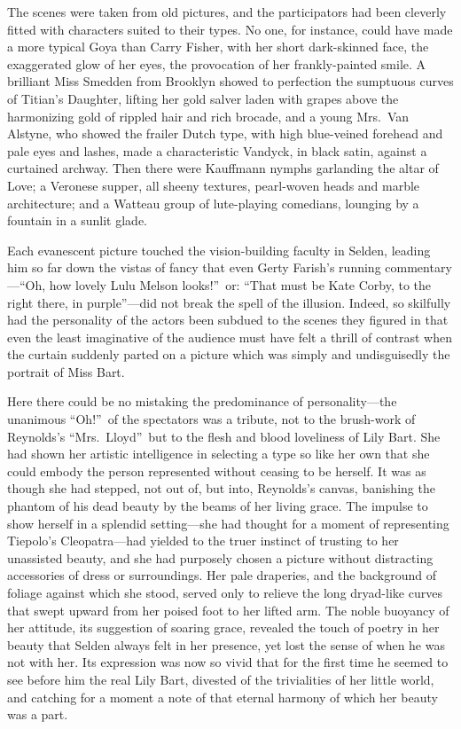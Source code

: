 \documentclass[12pt,a4paper]{book}
\begin{document}
The scenes were taken from old pictures, and the participators
had been cleverly fitted with characters suited to their types. 
No one, for instance, could have made a more typical Goya than
Carry Fisher, with her short dark-skinned face, the exaggerated
glow of her eyes, the provocation of her frankly-painted smile. A
brilliant Miss Smedden from Brooklyn showed to perfection the
sumptuous curves of Titian's Daughter, lifting her gold salver
laden with grapes above the harmonizing gold of rippled hair and
rich brocade, and a young Mrs.\ Van Alstyne, who showed the
frailer Dutch type, with high blue-veined forehead and pale eyes
and lashes, made a characteristic Vandyck, in black satin,
against a curtained archway. Then there were Kauffmann nymphs
garlanding the altar of Love; a Veronese supper, all sheeny
textures, pearl-woven heads and marble architecture; and a
Watteau group of lute-playing comedians, lounging by a fountain
in a sunlit glade.





Each evanescent picture touched the vision-building faculty in
Selden, leading him so far down the vistas of fancy that even
Gerty Farish's running commentary---``Oh, how lovely Lulu Melson
looks!''\ or: ``That must be Kate Corby, to the right there, in
purple''---did not break the spell of the illusion. Indeed, so
skilfully had the personality of the actors been subdued to the
scenes they figured in that even the least imaginative of the
audience must have felt a thrill of contrast when the curtain
suddenly parted on a picture which was simply and undisguisedly
the portrait of Miss Bart.





Here there could be no mistaking the predominance of
personality---the unanimous ``Oh!''\ of the spectators was a tribute,
not to the brush-work of Reynolds's ``Mrs.\ Lloyd''\ but to the flesh
and blood loveliness of Lily Bart. She had shown her artistic
intelligence in selecting a type so like her own that she could
embody the person represented without ceasing to be
herself. It was as though she had stepped, not out of, but into,
Reynolds's canvas, banishing the phantom of his dead beauty by
the beams of her living grace. The impulse to show herself in a
splendid setting---she had thought for a moment of representing
Tiepolo's Cleopatra---had yielded to the truer instinct of
trusting to her unassisted beauty, and she had purposely chosen a
picture without distracting accessories of dress or surroundings. 
Her pale draperies, and the background of foliage against which
she stood, served only to relieve the long dryad-like curves that
swept upward from her poised foot to her lifted arm. The noble
buoyancy of her attitude, its suggestion of soaring grace,
revealed the touch of poetry in her beauty that Selden always
felt in her presence, yet lost the sense of when he was not with
her. Its expression was now so vivid that for the first time he
seemed to see before him the real Lily Bart, divested of the
trivialities of her little world, and catching for a moment a
note of that eternal harmony of which her beauty was a part.
\end{document}
